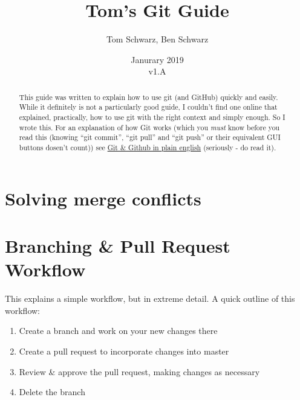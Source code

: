 \documentclass[a4paper, titlepage]{article}
\title{Tom's Git Guide}
\author{Tom Schwarz, Ben Schwarz}
\date{Janurary 2019\\v1.A} %
\begin{document}
\maketitle

\tableofcontents

\renewcommand{\abstractname}{Introduction} %
\begin{abstract}
This guide was written to explain how to use git (and GitHub) quickly and easily. While it definitely is not a particularly good guide, I couldn't find one online that explained, practically, how to use git with the right context and simply enough. So I wrote this. For an explanation of how Git works (which you \emph{must} know before you read this (knowing ``git commit'', ``git pull'' and ``git push'' or their equivalent GUI buttons dosen't count)) see \href{https://blog.red-badger.com/2016/11/29/gitgithub-in-plain-english}{Git \& Github in plain english} (seriously - do read it).
\end{abstract}

\section{Solving merge conflicts}
\label{sec:solving_merge_conflicts}

\section{Branching \& Pull Request Workflow}
\label{sec:branching_pull_request_workflow}
This explains a simple workflow, but in extreme detail. A quick outline of this workflow:
\begin{enumerate}
	\item Create a branch and work on your new changes there
	\item Create a pull request to incorporate changes into master
	\item Review \& approve the pull request, making changes as necessary
	\item Delete the branch
\end{enumerate}
\end{document}
